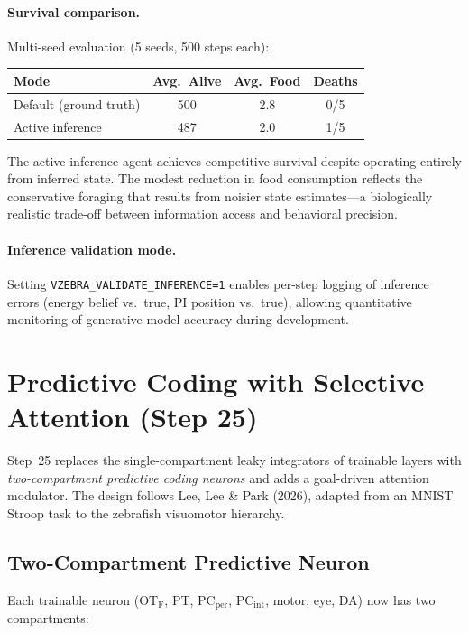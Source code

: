 \documentclass[11pt,a4paper]{article}
\begin{document}
\paragraph{Survival comparison.}
Multi-seed evaluation (5 seeds, 500 steps each):
\begin{center}
\begin{tabular}{lccc}
\toprule
Mode & Avg.\ Alive & Avg.\ Food & Deaths \\
\midrule
Default (ground truth)      & 500 & 2.8 & 0/5 \\
Active inference             & 487 & 2.0 & 1/5 \\
\bottomrule
\end{tabular}
\end{center}
The active inference agent achieves competitive survival despite operating
entirely from inferred state.
The modest reduction in food consumption reflects the conservative foraging
that results from noisier state estimates---a biologically realistic
trade-off between information access and behavioral precision.

\paragraph{Inference validation mode.}
Setting \texttt{VZEBRA\_VALIDATE\_INFERENCE=1} enables per-step logging of
inference errors (energy belief vs.\ true, PI position vs.\ true), allowing
quantitative monitoring of generative model accuracy during development.

\section{Predictive Coding with Selective Attention (Step 25)}\label{sec:predictive_attention}

Step~25 replaces the single-compartment leaky integrators of trainable
layers with \emph{two-compartment predictive coding neurons} and adds a
goal-driven attention modulator.  The design follows
Lee, Lee \& Park (2026), adapted from an MNIST Stroop task to the
zebrafish visuomotor hierarchy.

\subsection{Two-Compartment Predictive Neuron}\label{sec:twocomp_pred}

Each trainable neuron (OT$_\text{F}$, PT, PC$_\text{per}$,
PC$_\text{int}$, motor, eye, DA) now has two compartments:
\end{document}
